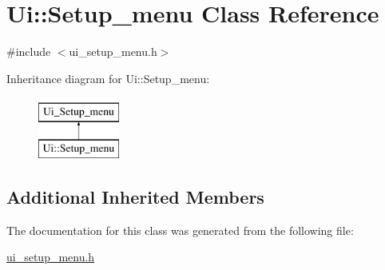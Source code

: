 \hypertarget{classUi_1_1Setup__menu}{\section{Ui\-:\-:Setup\-\_\-menu Class Reference}
\label{classUi_1_1Setup__menu}
}


{\ttfamily \#include $<$ui\-\_\-setup\-\_\-menu.\-h$>$}

Inheritance diagram for Ui\-:\-:Setup\-\_\-menu\-:\begin{figure}[H]
\begin{center}
\leavevmode
\includegraphics[height=2.000000cm]{classUi_1_1Setup__menu}
\end{center}
\end{figure}
\subsection*{Additional Inherited Members}


The documentation for this class was generated from the following file\-:\begin{DoxyCompactItemize}
\item 
\hyperlink{ui__setup__menu_8h}{ui\-\_\-setup\-\_\-menu.\-h}\end{DoxyCompactItemize}
